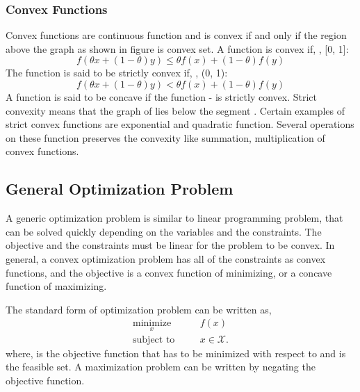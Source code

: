 \subsubsection{Convex Functions}

Convex functions are continuous function and is convex if and only if the region above the graph as shown in figure is convex set. A function  is convex if, \me{\forall}  \me{\in} , \me{ \forall} \me{ \theta \in} [0, 1]: 
\begin{equation}
f(\theta x + (1 - \theta) y) \leq \theta f(x) + (1 - \theta) f(y)
\end{equation}
The function  is said to be strictly convex if, \me{ \forall}  \me{\in} , \me{ \forall} \me{ \theta \in} (0, 1):
\begin{equation}
f(\theta x + (1 - \theta) y) < \theta f(x) + (1 - \theta) f(y)
\end{equation}
A function  is said to be concave if the function - is strictly convex. Strict convexity means that the graph of  lies below the segment . Certain examples of strict convex functions are exponential and quadratic function. Several operations on these function preserves the convexity like summation, multiplication of convex functions. 

\subsection{ General Optimization Problem}

A generic optimization problem is similar to linear programming problem, that can be solved quickly depending on the variables and the constraints. The objective and the constraints must be linear for the problem to be convex. In general, a convex optimization problem has all of the constraints as convex functions, and the objective is a convex function of minimizing, or a concave function of maximizing. 

The standard form of optimization problem can be written as,
\begin{eqnarray}
\underset{x}{\text{minimize}} \quad && f(x) \\
\text{subject to} \quad && x \in \mathcal{X}. 
\end{eqnarray}
where,  is the objective function that has to be minimized with respect to  and  \me{\subset}  is the feasible set. A maximization problem can be written by negating the objective function.

